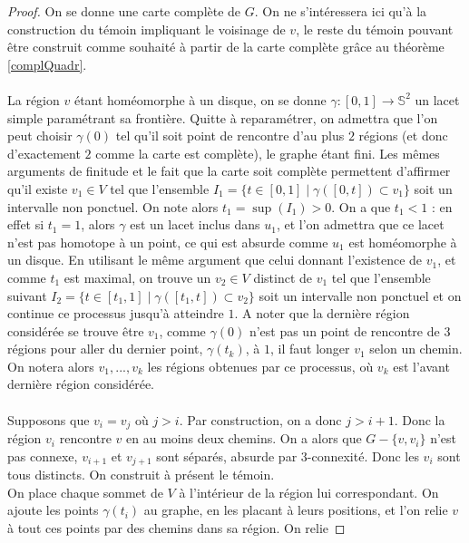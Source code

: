 \documentclass{scrartcl}
\begin{document}
\begin{flushleft}
\begin{proof}
    On se donne une carte complète de $G$. On ne s'intéressera ici qu'à la construction du témoin impliquant le voisinage de $v$,
    le reste du témoin pouvant être construit comme souhaité à partir de la carte complète grâce au théorème \ref{complQuadr}.
    \\~\\
    La région $v$ étant homéomorphe à un disque, on se donne
    $\gamma : [0, 1] \rightarrow \mathbb{S}^2$ un lacet simple paramétrant sa frontière. Quitte à reparamétrer, on admettra
    que l'on peut choisir $\gamma(0)$ tel qu'il soit point de rencontre d'au plus $2$ régions
    (et donc d'exactement $2$ comme la carte est complète), le graphe étant fini. Les mêmes arguments de finitude et
    le fait que la carte soit complète permettent d'affirmer qu'il existe $v_1 \in V$ tel que l'ensemble
    $I_1 = \{ t \in [0, 1] \mid \gamma([0, t]) \subset v_1 \}$ soit un intervalle non ponctuel. On note alors $t_1 = \sup(I_1) > 0$.
    On a que $t_1 < 1$ : en effet si $t_1 = 1$, alors $\gamma$ est un lacet inclus dans $u_1$, et l'on admettra que ce lacet
    n'est pas homotope à un point, ce qui est absurde comme $u_1$ est homéomorphe à un disque. En utilisant le même argument que
    celui donnant l'existence de $v_1$, et comme $t_1$ est maximal, on trouve un $v_2 \in V$ distinct de $v_1$ tel que l'ensemble
    suivant $I_2 = \{ t \in [t_1, 1] \mid \gamma([t_1, t]) \subset v_2\}$ soit un intervalle non ponctuel et on continue ce
    processus jusqu'à atteindre $1$. A noter que la dernière région considérée se trouve être $v_1$, comme $\gamma(0)$ n'est pas un
    point de rencontre de $3$ régions pour aller du dernier point, $\gamma(t_k)$, à $1$, il faut longer $v_1$ selon un chemin.
    On notera alors $v_1, ..., v_k$ les régions obtenues par ce processus, où $v_k$ est l'avant dernière région considérée.
    \\~\\
    Supposons que $v_i = v_j$ où $j > i$. Par construction, on a donc $j > i + 1$. Donc la région $v_i$ rencontre
    $v$ en au moins deux chemins. On a alors que $G - \{v, v_i\}$ n'est pas connexe, $v_{i+1}$ et $v_{j+1}$ sont séparés, absurde
    par $3$-connexité. Donc les $v_i$ sont tous distincts. On construit à présent le témoin.\\
    On place chaque sommet de $V$ à l'intérieur de la région lui correspondant. On ajoute les points $\gamma(t_i)$ au
    graphe, en les placant à leurs positions, et l'on relie $v$ à tout ces points par des chemins dans sa région. On relie

\end{proof}
\end{flushleft}
\end{document}

